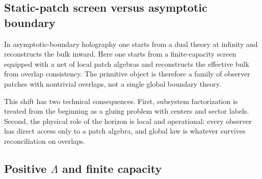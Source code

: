 \documentclass[11pt]{article}
\begin{document}
\subsection{Static-patch screen versus asymptotic boundary}

In asymptotic-boundary holography one starts from a dual theory at infinity and reconstructs the bulk inward. Here one starts from a finite-capacity screen equipped with a net of local patch algebras and reconstructs the effective bulk from overlap consistency. The primitive object is therefore a family of observer patches with nontrivial overlaps, not a single global boundary theory.

This shift has two technical consequences. First, subsystem factorization is treated from the beginning as a gluing problem with centers and sector labels. Second, the physical role of the horizon is local and operational: every observer has direct access only to a patch algebra, and global law is whatever survives reconciliation on overlaps.

\subsection{Positive $\Lambda$ and finite capacity}
\end{document}
